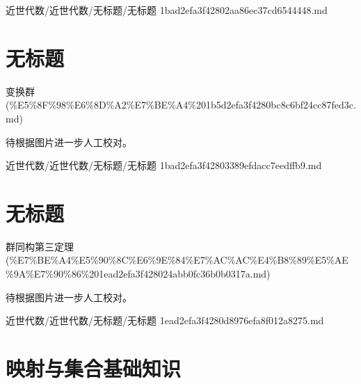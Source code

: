 \begin{note}[来源路径]

近世代数/近世代数/无标题/无标题 1bad2efa3f42802aa86ec37cd6544448.md

\end{note}

\section*{无标题}

\begin{note}[来源上级主题]

变换群 (\%E5\%8F\%98\%E6\%8D\%A2\%E7\%BE\%A4\%201b5d2efa3f4280bc8c6bf24cc87fed3c.md)

\end{note}

\begin{note}[无标题]

待根据图片进一步人工校对。

\end{note}

\begin{note}[来源路径]

近世代数/近世代数/无标题/无标题 1bad2efa3f42803389efdacc7eedffb9.md

\end{note}

\section*{无标题}

\begin{note}[来源上级主题]

群同构第三定理 (\%E7\%BE\%A4\%E5\%90\%8C\%E6\%9E\%84\%E7\%AC\%AC\%E4\%B8\%89\%E5\%AE\%9A\%E7\%90\%86\%201ead2efa3f428024abb0fc36b0b0317a.md)

\end{note}

\begin{note}[无标题]

待根据图片进一步人工校对。

\end{note}

\begin{note}[来源路径]

近世代数/近世代数/无标题/无标题 1ead2efa3f4280d8976efa8f012a8275.md

\end{note}

\section*{映射与集合基础知识}


